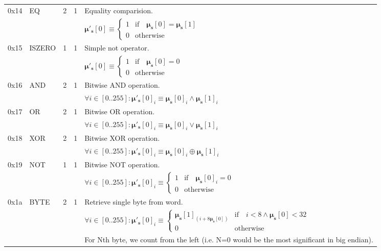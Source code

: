 \documentclass[9pt,oneside]{amsart}
\begin{document}
\begin{tabular*}{\columnwidth}[h]{rlrrl}
\midrule
0x14 & {\small EQ} & 2 & 1 & Equality comparision. \\
&&&& $\boldsymbol{\mu}'_\mathbf{s}[0] \equiv \begin{cases} 1 & \text{if} \quad \boldsymbol{\mu}_\mathbf{s}[0] = \boldsymbol{\mu}_\mathbf{s}[1] \\ 0 & \text{otherwise} \end{cases}$ \\
\midrule
0x15 & {\small ISZERO} & 1 & 1 & Simple not operator. \\
&&&& $\boldsymbol{\mu}'_\mathbf{s}[0] \equiv \begin{cases} 1 & \text{if} \quad \boldsymbol{\mu}_\mathbf{s}[0] = 0 \\ 0 & \text{otherwise} \end{cases}$ \\
\midrule
0x16 & {\small AND} & 2 & 1 & Bitwise AND operation. \\
&&&& $\forall i \in [0..255]: \boldsymbol{\mu}'_\mathbf{s}[0]_i \equiv \boldsymbol{\mu}_\mathbf{s}[0]_i \wedge \boldsymbol{\mu}_\mathbf{s}[1]_i$ \\
\midrule
0x17 & {\small OR} & 2 & 1 & Bitwise OR operation. \\
&&&& $\forall i \in [0..255]: \boldsymbol{\mu}'_\mathbf{s}[0]_i \equiv \boldsymbol{\mu}_\mathbf{s}[0]_i \vee \boldsymbol{\mu}_\mathbf{s}[1]_i$ \\
\midrule
0x18 & {\small XOR} & 2 & 1 & Bitwise XOR operation. \\
&&&& $\forall i \in [0..255]: \boldsymbol{\mu}'_\mathbf{s}[0]_i \equiv \boldsymbol{\mu}_\mathbf{s}[0]_i \oplus \boldsymbol{\mu}_\mathbf{s}[1]_i$ \\
\midrule
0x19 & {\small NOT} & 1 & 1 & Bitwise NOT operation. \\
&&&& $\forall i \in [0..255]: \boldsymbol{\mu}'_\mathbf{s}[0]_i \equiv \begin{cases} 1 & \text{if} \quad \boldsymbol{\mu}_\mathbf{s}[0]_i = 0 \\ 0 & \text{otherwise} \end{cases}$ \\
\midrule
0x1a & {\small BYTE} & 2 & 1 & Retrieve single byte from word. \\
&&&& $\forall i \in [0..255]: \boldsymbol{\mu}'_\mathbf{s}[0]_i \equiv \begin{cases} \boldsymbol{\mu}_\mathbf{s}[1]_{(i + 8\boldsymbol{\mu}_\mathbf{s}[0])} & \text{if} \quad i < 8 \wedge \boldsymbol{\mu}_\mathbf{s}[0] < 32 \\ 0 & \text{otherwise} \end{cases} $\\
&&&& For Nth byte, we count from the left (i.e. N=0 would be the most significant in big endian). \\
\bottomrule
\end{tabular*}
\end{document}
